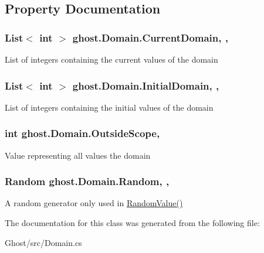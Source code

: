 \subsection{Property Documentation}
\hypertarget{classghost_1_1Domain_abd984b917c72272a80473d5428157671}{
\subsubsection[{Current\-Domain}]{\setlength{\rightskip}{0pt plus 5cm}List$<$ int $>$ ghost.\-Domain.\-Current\-Domain\hspace{0.3cm}{\ttfamily [get]}, {\ttfamily [set]}, {\ttfamily [protected]}}}\label{classghost_1_1Domain_abd984b917c72272a80473d5428157671}
List of integers containing the current values of the domain \hypertarget{classghost_1_1Domain_a810463ee3ee80c8095bbdac1b30edb86}{
\subsubsection[{Initial\-Domain}]{\setlength{\rightskip}{0pt plus 5cm}List$<$ int $>$ ghost.\-Domain.\-Initial\-Domain\hspace{0.3cm}{\ttfamily [get]}, {\ttfamily [set]}, {\ttfamily [protected]}}}\label{classghost_1_1Domain_a810463ee3ee80c8095bbdac1b30edb86}
List of integers containing the initial values of the domain \hypertarget{classghost_1_1Domain_ac1ede7f9b03b36ff82f73039b9ba1a56}{
\subsubsection[{Outside\-Scope}]{\setlength{\rightskip}{0pt plus 5cm}int ghost.\-Domain.\-Outside\-Scope\hspace{0.3cm}{\ttfamily [get]}, {\ttfamily [set]}}}\label{classghost_1_1Domain_ac1ede7f9b03b36ff82f73039b9ba1a56}
Value representing all values the domain \hypertarget{classghost_1_1Domain_aba5a8cf2502ff919644448730e309c85}{
\subsubsection[{Random}]{\setlength{\rightskip}{0pt plus 5cm}Random ghost.\-Domain.\-Random\hspace{0.3cm}{\ttfamily [get]}, {\ttfamily [set]}, {\ttfamily [protected]}}}\label{classghost_1_1Domain_aba5a8cf2502ff919644448730e309c85}
A random generator only used in \hyperlink{classghost_1_1Domain_a953d7b49d7822b351e7c6df7e93c5fbc}{Random\-Value()} 

The documentation for this class was generated from the following file\-:\begin{DoxyCompactItemize}
\item 
Ghost/src/Domain.\-cs\end{DoxyCompactItemize}
